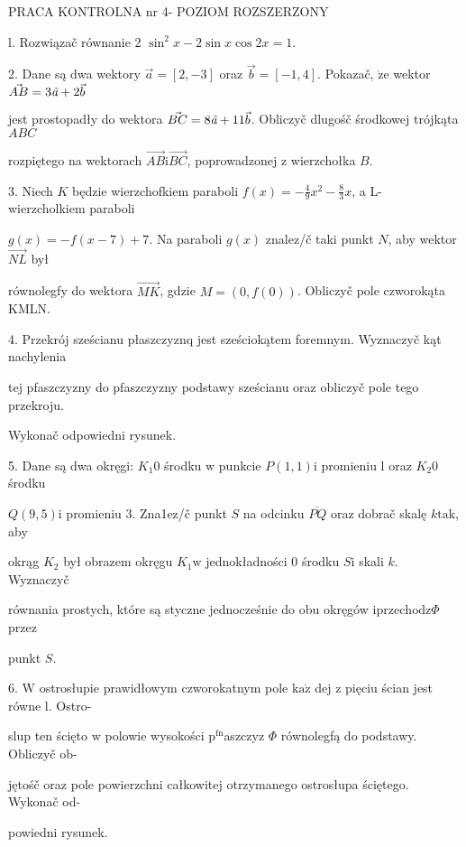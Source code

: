 \documentclass[a4paper,12pt]{article}
\begin{document}
PRACA KONTROLNA nr 4- POZIOM ROZSZERZONY

l. Rozwiązač równanie 2 $\sin^{2}x-2\sin x\cos 2x=1.$

2. Dane są dwa wektory $\vec{a}= [2,-3]$ oraz $\vec{b}= [-1,4]$. Pokazač, $\dot{\mathrm{z}}\mathrm{e}$ wektor $\vec{AB}=3\text{{\it ã}}+2\vec{b}$

jest prostopadły do wektora $\vec{BC}=8\text{{\it ã}}+11\vec{b}$. Obliczyč dlugośč środkowej trójkąta $ABC$

rozpiętego na wektorach $\vec{AB}\mathrm{i}\vec{BC}$, poprowadzonej $\mathrm{z}$ wierzchołka $B.$

3. Niech $K$ będzie wierzchofkiem paraboli $f(x)=-\displaystyle \frac{4}{9}x^{2}-\frac{8}{3}x$, a L- wierzcholkiem paraboli

$g(x) = -f(x-7)+7$. Na paraboli $g(x)$ znalez/č taki punkt $N$, aby wektor $\vec{NL}$ był

równolegfy do wektora $\vec{MK}$, gdzie $M=(0,f(0))$. Obliczyč pole czworokąta KMLN.

4. Przekrój sześcianu płaszczyznq jest sześciokątem foremnym. Wyznaczyč kąt nachylenia

tej pfaszczyzny do pfaszczyzny podstawy sześcianu oraz obliczyč pole tego przekroju.

Wykonač odpowiedni rysunek.

5. Dane są dwa okręgi: $K_{1} 0$ środku $\mathrm{w}$ punkcie $P(1,1) \mathrm{i}$ promieniu l oraz $K_{2} 0$ środku

$Q(9,5) \mathrm{i}$ promieniu 3. Zna1ez/č punkt $S$ na odcinku $\overline{PQ}$ oraz dobrač skalę $k\mathrm{t}\mathrm{a}\mathrm{k}$, aby

okrąg $K_{2}$ był obrazem okręgu $K_{1} \mathrm{w}$ jednokładności $0$ środku $S\mathrm{i}$ skali $k$. Wyznaczyč

równania prostych, które są styczne jednocześnie do obu okręgów $\mathrm{i}\mathrm{p}\mathrm{r}\mathrm{z}\mathrm{e}\mathrm{c}\mathrm{h}\mathrm{o}\mathrm{d}\mathrm{z}\Phi$ przez

punkt $S.$

6. $\mathrm{W}$ ostrosłupie prawidłowym czworokatnym pole $\mathrm{k}\mathrm{a}\dot{\mathrm{z}}$ dej $\mathrm{z}$ pięciu ścian jest równe l. Ostro-

slup ten ścięto $\mathrm{w}$ polowie wysokości $\mathrm{p}^{\mathrm{f}\mathrm{n}}$aszczyz $\Phi$ równolegfą do podstawy. Obliczyč ob-

jętośč oraz pole powierzchni całkowitej otrzymanego ostrosłupa ściętego. Wykonač od-

powiedni rysunek.
\end{document}
